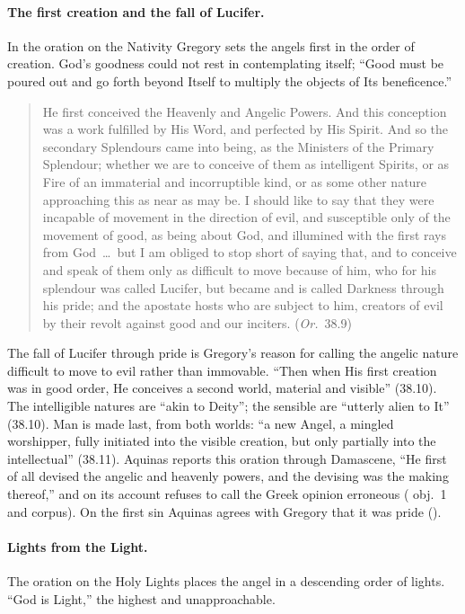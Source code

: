 \paragraph{The first creation and the fall of Lucifer.} In the oration
on the Nativity Gregory sets the angels first in the order of creation.
God's goodness could not rest in contemplating itself; ``Good must be
poured out and go forth beyond Itself to multiply the objects of Its
beneficence.''

\begin{quote}
He first conceived the Heavenly and Angelic Powers. And this conception
was a work fulfilled by His Word, and perfected by His Spirit. And so the
secondary Splendours came into being, as the Ministers of the Primary
Splendour; whether we are to conceive of them as intelligent Spirits, or
as Fire of an immaterial and incorruptible kind, or as some other nature
approaching this as near as may be. I should like to say that they were
incapable of movement in the direction of evil, and susceptible only of
the movement of good, as being about God, and illumined with the first
rays from God~\dots\ but I am obliged to stop short of saying that, and to
conceive and speak of them only as difficult to move because of him, who
for his splendour was called Lucifer, but became and is called Darkness
through his pride; and the apostate hosts who are subject to him,
creators of evil by their revolt against good and our inciters.
(\emph{Or.}~38.9)
\end{quote}

\noindent The fall of Lucifer through pride is Gregory's reason for
calling the angelic nature difficult to move to evil rather than immovable.
``Then when His first creation was in good order, He conceives a second
world, material and visible'' (38.10). The intelligible natures are
``akin to Deity''; the sensible are ``utterly alien to It'' (38.10). Man
is made last, from both worlds: ``a new Angel, a mingled worshipper,
fully initiated into the visible creation, but only partially into the
intellectual'' (38.11). Aquinas reports this oration through Damascene,
``He first of all devised the angelic and heavenly powers, and the
devising was the making thereof,'' and on its account refuses to call
the Greek opinion erroneous ( obj.~1 and corpus). On the
first sin Aquinas agrees with Gregory that it was pride ().

\paragraph{Lights from the Light.} The oration on the Holy Lights places
the angel in a descending order of lights. ``God is Light,'' the highest
and unapproachable.


